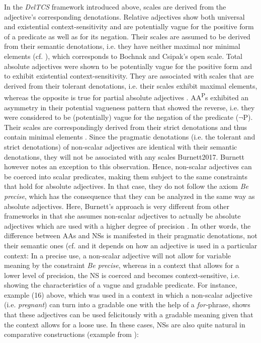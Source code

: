 \documentclass[output=paper
,modfonts
,nonflat]{langsci/langscibook}
\begin{document}
In the \textit{DelTCS} framework introduced above, scales are derived from the adjective's corresponding denotations. Relative adjectives show both universal and existential context-sensitivity and are potentially vague for the positive form of a predicate as well as for its negation. Their scales are assumed to be derived from their semantic denotations, i.e. they have neither maximal nor minimal elements (cf. \citealt[90,107]{Burnett2017}), which corresponds to Bochnak and Csipak's open scale. Total absolute adjectives were shown to be potentially vague for the positive form and to exhibit existential context-sensitivity. They are associated with scales that are derived from their tolerant denotations, i.e. their scales exhibit maximal elements, whereas the opposite is true for partial absolute adjectives \citeyearpar[90,106]{Burnett2017}. AA\textsuperscript{P}s exhibited an asymmetry in their potential vagueness pattern that showed the reverse, i.e. they were considered to be (potentially) vague for the negation of the predicate ($\neg$P). Their scales are correspondingly derived from their strict denotations and thus contain minimal elements \citeyearpar[90,106]{Burnett2017}. Since the pragmatic denotations (i.e. the tolerant and strict denotations) of non-scalar adjectives are identical with their semantic denotations, they will not be associated with any scales \citeyearpar[90]{}{Burnett2017}. Burnett however notes an exception to this observation. Hence, non-scalar adjectives can be coerced into scalar predicates, making them subject to the same constraints that hold for absolute adjectives. In that case, they do not follow the axiom \textit{Be precise}, which has the consequence that they can be analyzed in the same way as absolute adjectives. Here, Burnett's approach is very different from other frameworks in that she assumes non-scalar adjectives to actually be absolute adjectives which are used with a higher degree of precision \citeyearpar[97-98]{Burnett2017}. In other words, the difference between AAs and NSs is manifested in their pragmatic denotations, not their semantic ones (cf. \textcite[98]{Burnett2017} and it depends on how an adjective is used in a particular context: In a precise use, a non-scalar adjective will not allow for variable meaning by the constraint \textit{Be precise}, whereas in a context that allows for a lower level of precision, the NS is coerced and becomes context-sensitive, i.e. showing the characteristics of a vague and gradable predicate. For instance, example (16) above, which was used in a context in which a non-scalar adjective (i.e. \textit{pregnant}) can turn into a gradable one with the help of a \textit{for-}phrase, shows that these adjectives can be used felicitously with a gradable meaning given that the context allows for a loose use. In these cases, NSs are also quite natural in comparative constructions (example from \citealt[96]{Burnett2017}):
\end{document}
